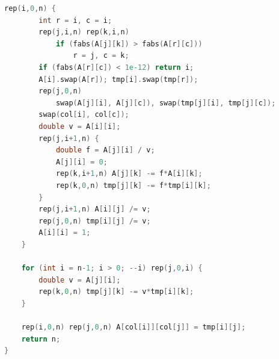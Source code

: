 \begin{multicols}{\Columns}
\begin{lstlisting}[language=C++]
	rep(i,0,n) {
		int r = i, c = i;
		rep(j,i,n) rep(k,i,n)
			if (fabs(A[j][k]) > fabs(A[r][c]))
				r = j, c = k;
		if (fabs(A[r][c]) < 1e-12) return i;
		A[i].swap(A[r]); tmp[i].swap(tmp[r]);
		rep(j,0,n)
			swap(A[j][i], A[j][c]), swap(tmp[j][i], tmp[j][c]);
		swap(col[i], col[c]);
		double v = A[i][i];
		rep(j,i+1,n) {
			double f = A[j][i] / v;
			A[j][i] = 0;
			rep(k,i+1,n) A[j][k] -= f*A[i][k];
			rep(k,0,n) tmp[j][k] -= f*tmp[i][k];
		}
		rep(j,i+1,n) A[i][j] /= v;
		rep(j,0,n) tmp[i][j] /= v;
		A[i][i] = 1;
	}

	for (int i = n-1; i > 0; --i) rep(j,0,i) {
		double v = A[j][i];
		rep(k,0,n) tmp[j][k] -= v*tmp[i][k];
	}

	rep(i,0,n) rep(j,0,n) A[col[i]][col[j]] = tmp[i][j];
	return n;
}
\end{lstlisting}

\end{multicols}
